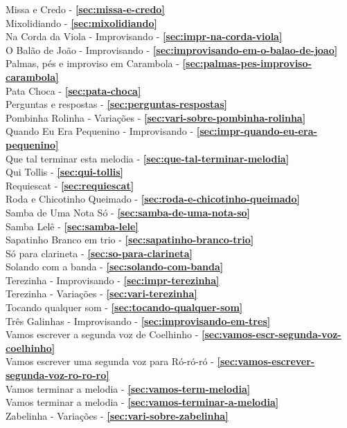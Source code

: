 Missa e Credo - \textbf{\ref{sec:missa-e-credo}} \\
Mixolidiando - \textbf{\ref{sec:mixolidiando}} \\
Na Corda da Viola - Improvisando - \textbf{\ref{sec:impr-na-corda-viola}} \\
O Balão de João - Improvisando - \textbf{\ref{sec:improvisando-em-o-balao-de-joao}} \\
Palmas, pés e improviso em Carambola - \textbf{\ref{sec:palmas-pes-improviso-carambola}} \\
Pata Choca - \textbf{\ref{sec:pata-choca}} \\
Perguntas e respostas - \textbf{\ref{sec:perguntas-respostas}} \\
Pombinha Rolinha - Variações - \textbf{\ref{sec:vari-sobre-pombinha-rolinha}} \\
Quando Eu Era Pequenino - Improvisando - \textbf{\ref{sec:impr-quando-eu-era-pequenino}} \\
Que tal terminar esta melodia - \textbf{\ref{sec:que-tal-terminar-melodia}} \\
Qui Tollis - \textbf{\ref{sec:qui-tollis}} \\
Requiescat - \textbf{\ref{sec:requiescat}} \\
Roda e Chicotinho Queimado - \textbf{\ref{sec:roda-e-chicotinho-queimado}} \\
Samba de Uma Nota Só - \textbf{\ref{sec:samba-de-uma-nota-so}} \\
Samba Lelê - \textbf{\ref{sec:samba-lele}} \\
Sapatinho Branco em trio - \textbf{\ref{sec:sapatinho-branco-trio}} \\
Só para clarineta - \textbf{\ref{sec:so-para-clarineta}} \\
Solando com a banda - \textbf{\ref{sec:solando-com-banda}} \\
Terezinha - Improvisando - \textbf{\ref{sec:impr-terezinha}} \\
Terezinha - Variações - \textbf{\ref{sec:vari-terezinha}} \\
Tocando qualquer som - \textbf{\ref{sec:tocando-qualquer-som}} \\
Três Galinhas - Improvisando - \textbf{\ref{sec:improvisando-em-tres}} \\
Vamos escrever a segunda voz de Coelhinho - \textbf{\ref{sec:vamos-escr-segunda-voz-coelhinho}} \\
Vamos escrever uma segunda voz para Ró-ró-ró - \textbf{\ref{sec:vamos-escrever-segunda-voz-ro-ro-ro}} \\
Vamos terminar a melodia - \textbf{\ref{sec:vamos-term-melodia}} \\
Vamos terminar a melodia - \textbf{\ref{sec:vamos-terminar-a-melodia}} \\
Zabelinha - Variações - \textbf{\ref{sec:vari-sobre-zabelinha}} \\
